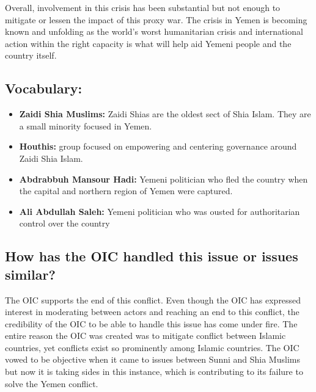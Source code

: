 \documentclass[10pt, letterpaper]{article}
\begin{document}
Overall, involvement in this crisis has been substantial but not enough
to mitigate or lessen the impact of this proxy war. The crisis in Yemen
is becoming known and unfolding as the world's worst humanitarian crisis
and international action within the right capacity is what will help aid
Yemeni people and the country itself. \\

\subsection{Vocabulary:}

\begin{itemize}
\item
  
  \textbf{Zaidi Shia Muslims:} Zaidi Shias are the oldest sect of Shia
  Islam. They are a small minority focused in Yemen.
  
\item
  
  \textbf{Houthis:} group focused on empowering and centering governance
  around Zaidi Shia Islam.
  
\item
  
  \textbf{Abdrabbuh Mansour Hadi:} Yemeni politician who fled the
  country when the capital and northern region of Yemen were captured.
  
\item
  
  \textbf{Ali Abdullah Saleh:} Yemeni politician who was ousted for
  authoritarian control over the country
  
\end{itemize}

\subsection{How has the OIC handled this issue or issues similar?}

The OIC supports the end of this conflict. Even though the OIC has
expressed interest in moderating between actors and reaching an end to
this conflict, the credibility of the OIC to be able to handle this
issue has come under fire. The entire reason the OIC was created was to
mitigate conflict between Islamic countries, yet conflicts exist so
prominently among Islamic countries. The OIC vowed to be objective when
it came to issues between Sunni and Shia Muslims but now it is taking
sides in this instance, which is contributing to its failure to solve
the Yemen conflict. \\
\end{document}
